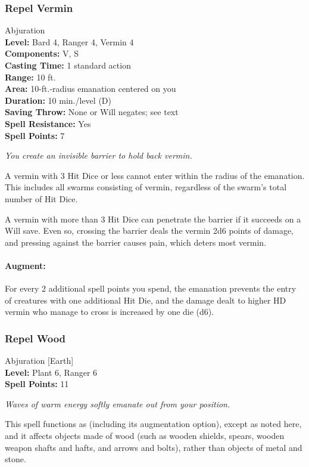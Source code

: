 \subsubsection{Repel Vermin}
\label{Spell:RepelVermin}
Abjuration
\\ \textbf{Level:} Bard 4, Ranger 4, Vermin 4
\\ \textbf{Components:} V, S
\\ \textbf{Casting Time:} 1 standard action
\\ \textbf{Range:} 10 ft.
\\ \textbf{Area:} 10-ft.-radius emanation centered on you
\\ \textbf{Duration:} 10 min./level (D)
\\ \textbf{Saving Throw:} None or Will negates; see text
\\ \textbf{Spell Resistance:} Yes
\\ \textbf{Spell Points:} 7

\emph{You create an invisible barrier to hold back vermin.} 

A vermin with 3 Hit Dice or less cannot enter within the radius of the emanation. 
This includes all swarms consisting of vermin, regardless of the swarm's total number of Hit Dice.

A vermin with more than 3 Hit Dice can penetrate the barrier if it succeeds on a Will save. 
Even so, crossing the barrier deals the vermin 2d6 points of damage, and pressing against the barrier causes pain, which deters most vermin.

\paragraph{Augment:} For every 2 additional spell points you spend, the emanation prevents the entry of creatures with one additional Hit Die, and the damage dealt to higher HD vermin who manage to cross is increased by one die (d6).
\subsubsection{Repel Wood}
\label{Spell:RepelWood}
Abjuration [Earth]
\\ \textbf{Level:} Plant 6, Ranger 6
\\ \textbf{Spell Points:} 11

\emph{Waves of warm energy softly emanate out from your position.}

This spell functions as  (including its augmentation option), except as noted here, and it affects objects made of wood (such as wooden shields, spears, wooden weapon shafts and hafts, and arrows and bolts), rather than objects of metal and stone.

